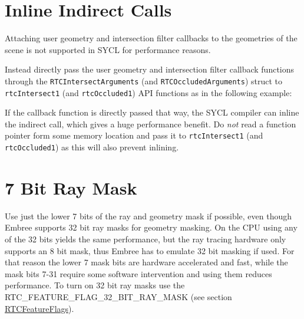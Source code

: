 \section{Inline Indirect Calls}\label{inline-indirect-calls}

Attaching user geometry and intersection filter callbacks to the
geometries of the scene is not supported in SYCL for performance
reasons.

Instead directly pass the user geometry and intersection filter callback
functions through the \texttt{RTCIntersectArguments} (and
\texttt{RTCOccludedArguments}) struct to \texttt{rtcIntersect1} (and
\texttt{rtcOccluded1}) API functions as in the following example:

\begin{Shaded}
\begin{Highlighting}[]
\OperatorTok{(}
  \OperatorTok{*}
\OperatorTok{)} \OperatorTok{\{}  \OperatorTok{\}}

\OperatorTok{;}
\OperatorTok{(\&}\OperatorTok{);}
\OperatorTok{=}\OperatorTok{;}

\OperatorTok{(}\OperatorTok{,\&}\OperatorTok{,\&}\OperatorTok{);}
\end{Highlighting}
\end{Shaded}

If the callback function is directly passed that way, the SYCL compiler
can inline the indirect call, which gives a huge performance benefit. Do
\emph{not} read a function pointer form some memory location and pass it
to \texttt{rtcIntersect1} (and \texttt{rtcOccluded1}) as this will also
prevent inlining.

\section{7 Bit Ray Mask}\label{bit-ray-mask}

Use just the lower 7 bits of the ray and geometry mask if possible, even
though Embree supports 32 bit ray masks for geometry masking. On the CPU
using any of the 32 bits yields the same performance, but the ray
tracing hardware only supports an 8 bit mask, thus Embree has to emulate
32 bit masking if used. For that reason the lower 7 mask bits are
hardware accelerated and fast, while the mask bits 7-31 require some
software intervention and using them reduces performance. To turn on 32
bit ray masks use the RTC\_FEATURE\_FLAG\_32\_BIT\_RAY\_MASK (see
section \hyperref[rtcfeatureflags]{RTCFeatureFlags}).

